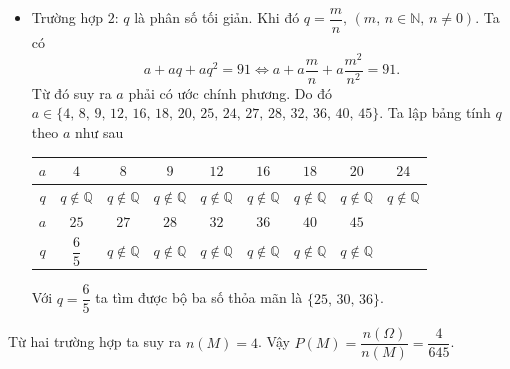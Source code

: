 \begin{vd}
{\begin{itemize}
\begin{itemize}
				$$1+q+q^2=13\Leftrightarrow \hoac{&q=3\\&q=-4.}$$
				Ta nhận $q=3$, suy ra bộ ba số thỏa mãn là $\{7,\,21,\,63\}$.
				\item Nếu $a=13$ ta được 
				$$1+q+q^2=7\Leftrightarrow \hoac{&q=2\\&q=-3.}$$
				Ta nhận $q=2$, suy ra bộ ba số thỏa mãn là $\{13,\,26,\,52\}$.
			\end{itemize} 
			\item Trường hợp $2$: $q$ là phân số tối giản. Khi đó $q=\dfrac{m}{n},\,(m,\,n\in \mathbb{N},\,n\neq 0)$. Ta có
			$$a+aq+aq^2=91\Leftrightarrow a+a\dfrac{m}{n}+a\dfrac{m^2}{n^2}=91.$$
			Từ đó suy ra $a$ phải có ước chính phương. Do đó $a\in\{4,\,8,\,9,\,12,\,16,\,18,\,20,\,25,\,24,\,27,\,28,\,32,\,36,\,40,\,45\}$. Ta lập bảng tính $q$ theo $a$ như sau
			\begin{center}
				\renewcommand{\arraystretch}{1.5}
				\begin{tabular}{|c|c|c|c|c|c|c|c|c|}
					\hline
					$a$&$ 4 $&$ 8 $&$ 9 $&$ 12 $&$ 16 $&$ 18 $&$ 20 $&$ 24 $\\
					\hline
					$q$&$q\notin \mathbb{Q}$&$q\notin \mathbb{Q}$&$q\notin \mathbb{Q}$&$q\notin \mathbb{Q}$&$q\notin \mathbb{Q}$&$q\notin \mathbb{Q}$&$q\notin \mathbb{Q}$&$q\notin \mathbb{Q}$\\
					\hline
					$a$&$ 25 $&$ 27 $&$ 28 $&$ 32 $&$ 36 $&$ 40 $&$ 45 $&\\ \hline
					$q$&$\dfrac{6}{5}$&$q\notin \mathbb{Q}$&$q\notin \mathbb{Q}$&$q\notin \mathbb{Q}$&$q\notin \mathbb{Q}$&$q\notin \mathbb{Q}$&$q\notin \mathbb{Q}$&\\
					\hline
				\end{tabular}
				\renewcommand{\arraystretch}{1}
			\end{center}
			\noindent
			Với $q=\dfrac{6}{5}$ ta tìm được bộ ba số thỏa mãn là $\{25,\,30,\,36\}$.
		\end{itemize}
		Từ hai trường hợp ta suy ra $n(M)=4$. Vậy $P(M)=\dfrac{n(\Omega)}{n(M)}=\dfrac{4}{645}$.
	}
\end{vd}
